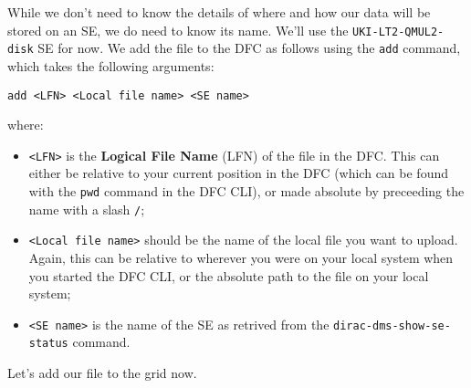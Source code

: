 While we don't need to know the details of where and how our data will
be stored on an SE, we do need to know its name. We'll use the
\texttt{UKI-LT2-QMUL2-disk} SE for now. We add the file to the DFC as
follows using the \texttt{add} command, which takes the following
arguments:

\begin{verbatim}
add <LFN> <Local file name> <SE name>
\end{verbatim}

where:

\begin{itemize}
\tightlist
\item
  \texttt{\textless{}LFN\textgreater{}} is the \textbf{Logical File
  Name} (LFN) of the file in the DFC. This can either be relative to
  your current position in the DFC (which can be found with the
  \texttt{pwd} command in the DFC CLI), or made absolute by preceeding
  the name with a slash \texttt{/};
\item
  \texttt{\textless{}Local\ file\ name\textgreater{}} should be the name
  of the local file you want to upload. Again, this can be relative to
  wherever you were on your local system when you started the DFC CLI,
  or the absolute path to the file on your local system;
\item
  \texttt{\textless{}SE\ name\textgreater{}} is the name of the SE as
  retrived from the \texttt{dirac-dms-show-se-status} command.
\end{itemize}

Let's add our file to the grid now.

\begin{Shaded}
\begin{Highlighting}[]
\NormalTok{$ }
 

 \NormalTok{: }
            
\NormalTok{:/}\KeywordTok{>} 
\KeywordTok{>} 
\KeywordTok{>} 
\KeywordTok{>} 

 
\KeywordTok{>}
 
\end{Highlighting}
\end{Shaded}

